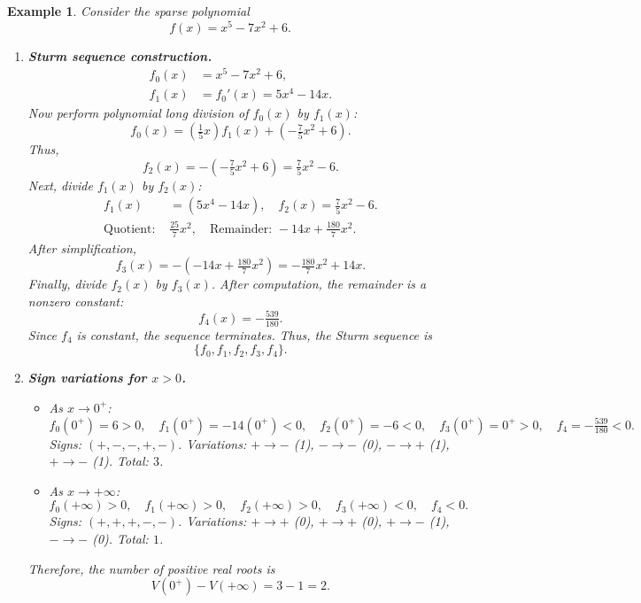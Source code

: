\documentclass[11pt]{article}
\newtheorem{example}{Example}
\begin{document}
\begin{example}
Consider the sparse polynomial
\[
f(x) = x^5 - 7x^2 + 6.
\]

\begin{enumerate}
    \item \textbf{Sturm sequence construction.}
    \begin{align*}
        f_0(x) &= x^5 - 7x^2 + 6, \\
        f_1(x) &= f_0'(x) = 5x^4 - 14x.
    \end{align*}
    Now perform polynomial long division of \(f_0(x)\) by \(f_1(x)\):
    \[
        f_0(x) = \left(\tfrac{1}{5}x\right) f_1(x) + \left(-\tfrac{7}{5}x^2 + 6\right).
    \]
    Thus,
    \[
        f_2(x) = -\left(-\tfrac{7}{5}x^2 + 6\right) = \tfrac{7}{5}x^2 - 6.
    \]
    Next, divide \(f_1(x)\) by \(f_2(x)\):
    \begin{align*}
        f_1(x) &= (5x^4 - 14x), \quad f_2(x) = \tfrac{7}{5}x^2 - 6. \\
        \text{Quotient: } & \tfrac{25}{7}x^2, \quad \text{Remainder: } -14x + \tfrac{180}{7}x^2. 
    \end{align*}
    After simplification,
    \[
        f_3(x) = -\left(-14x + \tfrac{180}{7}x^2\right) = -\tfrac{180}{7}x^2 + 14x.
    \]
    Finally, divide \(f_2(x)\) by \(f_3(x)\). After computation, the remainder is a nonzero constant:
    \[
        f_4(x) = -\tfrac{539}{180}.
    \]
    Since \(f_4\) is constant, the sequence terminates. Thus, the Sturm sequence is
    \[
        \{f_0, f_1, f_2, f_3, f_4\}.
    \]

    \item \textbf{Sign variations for \(x > 0\).}
    \begin{itemize}
        \item As \(x \to 0^+\):
        \[
        f_0(0^+) = 6 > 0, \quad
        f_1(0^+) = -14(0^+) < 0, \quad
        f_2(0^+) = -6 < 0, \quad
        f_3(0^+) = 0^+ > 0, \quad
        f_4 = -\tfrac{539}{180} < 0.
        \]
        Signs: \((+, -, -, +, -)\).  
        Variations: \(+ \to -\) (1), \(- \to -\) (0), \(- \to +\) (1), \(+ \to -\) (1).  
        Total: \(3\).
        
        \item As \(x \to +\infty\):
        \[
        f_0(+\infty) > 0, \quad f_1(+\infty) > 0, \quad f_2(+\infty) > 0, \quad f_3(+\infty) < 0, \quad f_4 < 0.
        \]
        Signs: \((+, +, +, -, -)\).  
        Variations: \(+ \to +\) (0), \(+ \to +\) (0), \(+ \to -\) (1), \(- \to -\) (0).  
        Total: \(1\).
    \end{itemize}
    Therefore, the number of positive real roots is
    \[
    V(0^+) - V(+\infty) = 3 - 1 = 2.
    \]


\end{enumerate}
\end{example}
\end{document}
